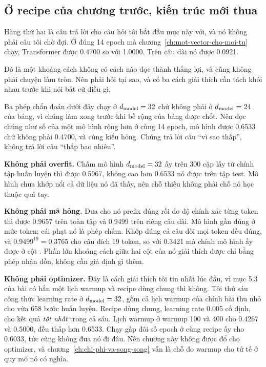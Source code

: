 \subsection*{Ở recipe của chương trước, kiến trúc mới thua}

%
Hàng thứ hai là câu trả lời cho câu hỏi tôi bắt đầu mục này với, và nó không
phải câu tôi chờ đợi. Ở đúng 14 epoch mà chương~\ref{ch:mot-vector-cho-moi-tu}
chạy, Transformer được 0.4700 so với 1.0000. Trên câu dài nó được 0.0921.

Đó là một khoảng cách không có cách nào đọc thành thắng lợi, và cũng không phải
chuyện làm tròn. Nên phải hỏi tại sao, và có ba cách giải thích cần tách khỏi
nhau trước khi nói bất cứ điều gì.

Ba phép chẩn đoán dưới đây chạy ở \(d_{\mathrm{model}} = 32\) chứ không phải ở
\(d_{\mathrm{model}} = 24\) của bảng, vì chúng làm xong trước khi bề rộng của bảng được
chốt. Nên đọc chúng như số của một mô hình rộng hơn ở cùng 14 epoch, mô hình
được 0.6533 chứ không phải 0.4700, và cùng kiểu hỏng. Chúng trả lời câu
\enquote{vì sao thấp}, không trả lời câu \enquote{thấp bao nhiêu}.

\textbf{Không phải overfit.} Chấm mô hình \(d_{\mathrm{model}} = 32\) ấy trên 300 cặp lấy
từ chính tập huấn luyện thì được 0.5967, không cao hơn 0.6533 nó được trên tập
test. Mô hình chưa khớp nổi cả dữ liệu nó đã thấy, nên chỗ thiếu không phải chỗ
nó học thuộc quá tay.

\textbf{Không phải mã hỏng.} Đưa cho nó prefix đúng rồi đo độ chính xác từng
token thì được 0.9657 trên toàn tập và 0.9499 trên riêng câu dài. Mô hình gần
đúng ở mức token; cái phạt nó là phép chấm. Khớp đúng cả câu đòi mọi token đều
đúng, và \(0.9499^{19} = 0.3765\) cho câu đích 19 token, so với 0.3421 mà chính
mô hình ấy được ở cột . Phần lớn khoảng cách giữa hai cột của nó giải
thích được chỉ bằng phép nhân dồn, không cần giả định gì thêm.

\textbf{Không phải optimizer.} Đây là cách giải thích tôi tin nhất lúc đầu, vì
mục 5.3 của bài có hẳn một lịch warmup và recipe dùng chung thì không. Tôi thử
sáu công thức learning rate ở \(d_{\mathrm{model}} = 32\), gồm cả lịch warmup của chính
bài thu nhỏ cho vừa 658 bước huấn luyện. Recipe dùng chung, learning rate 0.005
cố định, cho kết quả \emph{tốt nhất} trong cả sáu. Lịch warmup ở warmup 100 và
400 cho 0.4267 và 0.5000, đều thấp hơn 0.6533. Chạy gấp đôi số epoch ở cùng
recipe ấy cho 0.6033, tức cũng không đưa nó đi đâu. Nên chương này không được
đổ cho optimizer, và chương~\ref{ch:chi-phi-va-song-song} vẫn là chỗ đo warmup
cho tử tế ở quy mô nó có nghĩa.


